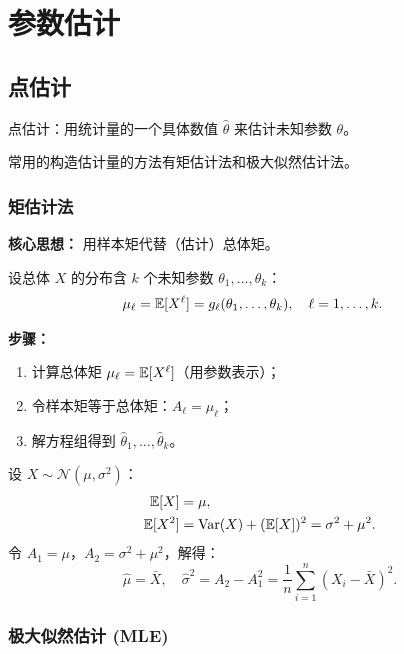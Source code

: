 \chapter{参数估计}

\section{点估计}

点估计：用统计量的一个具体数值 $\hat{\theta}$ 来估计未知参数 $\theta$。

常用的构造估计量的方法有矩估计法和极大似然估计法。

\subsection{矩估计法}

\textbf{核心思想：} 用样本矩代替（估计）总体矩。

设总体 $X$ 的分布含 $k$ 个未知参数 $\theta_1, \dots, \theta_k$：
\begin{align}
    \mu_\ell = \mathbb{E}[X^\ell] &= g_\ell(\theta_1, \dots, \theta_k), \quad \ell = 1,\dots,k.
\end{align}

\textbf{步骤：}
\begin{enumerate}
    \item 计算总体矩 $\mu_\ell = \mathbb{E}[X^\ell]$（用参数表示）；
    \item 令样本矩等于总体矩：$A_\ell = \mu_\ell$；
    \item 解方程组得到 $\hat{\theta}_1, \dots, \hat{\theta}_k$。
\end{enumerate}

\begin{example}[正态分布的矩估计]
设 $X \sim \mathcal{N}(\mu, \sigma^2)$：
\begin{align}
    \mathbb{E}[X]    &= \mu, \\
    \mathbb{E}[X^2]  &= \mathrm{Var}(X) + (\mathbb{E}[X])^2 = \sigma^2 + \mu^2.
\end{align}
令 $A_1 = \mu$，$A_2 = \sigma^2 + \mu^2$，解得：
\begin{equation}
    \hat{\mu} = \bar{X},\quad \hat{\sigma}^2 = A_2 - A_1^2 = \frac{1}{n}\sum_{i=1}^{n}(X_i - \bar{X})^2.
\end{equation}
\end{example}

\subsection{极大似然估计 (MLE)}

